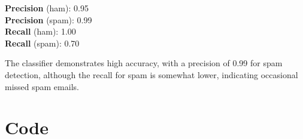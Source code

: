 \documentclass[a4paper]{article}
\begin{document}
\textbf{Precision} (ham): 0.95 \\
\textbf{Precision} (spam): 0.99 \\
\textbf{Recall} (ham): 1.00 \\
\textbf{Recall} (spam): 0.70

The classifier demonstrates high accuracy, with a precision of 0.99 for spam detection, although the recall for spam is somewhat lower, indicating occasional missed spam emails.


\printbibliography
\appendix

\section*{Code}
\label{app:excode}

\begin{lstlisting}

\end{lstlisting}
\end{document}
